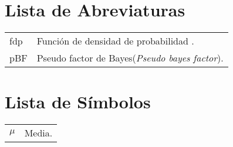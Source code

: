 \chapter{Lista de Abreviaturas}
	\begin{tabular}{ll}
	 		fdp     & Función de densidad de probabilidad .\\
		pBF 		& Pseudo factor de Bayes(\emph{Pseudo bayes factor}).\\
	\end{tabular}
	
	\chapter{Lista de Símbolos}
	\begin{tabular}{ll}
			$\mu$    & Media.\\
	\end{tabular}